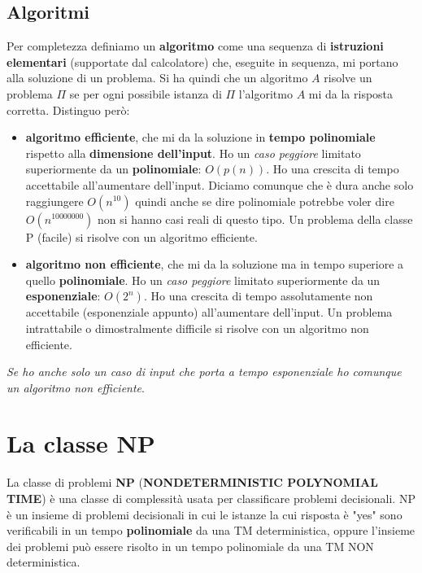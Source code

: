 \subsection{Algoritmi}
Per completezza definiamo un \textbf{algoritmo} come una sequenza di
\textbf{istruzioni elementari} (supportate dal calcolatore) che, eseguite in
sequenza, mi portano alla soluzione di un problema. Si ha quindi che un
algoritmo $A$ risolve un problema $\Pi$ se per ogni possibile istanza di $\Pi$
l'algoritmo $A$ mi da la risposta corretta. Distinguo però:
\begin{itemize}
	\item \textbf{algoritmo efficiente}, che mi da la soluzione in \textbf{tempo
	      polinomiale} rispetto alla \textbf{dimensione dell'input}. Ho un
	\textit{caso peggiore} limitato superiormente da un \textbf{polinomiale}:
	$O(p(n))$. Ho una crescita di tempo accettabile all'aumentare
	dell'input. Diciamo comunque che è dura anche solo raggiungere $O(n^{10})$
	quindi anche se dire polinomiale potrebbe voler dire $O(n^{10000000})$ non si
	hanno casi reali di questo tipo. Un problema della classe P (facile) si risolve con un algoritmo efficiente.
		  
	\item \textbf{algoritmo non efficiente}, che mi da la soluzione ma in tempo
	      superiore a quello \textbf{polinomiale}. Ho un \textit{caso peggiore} limitato
	      superiormente da un \textbf{esponenziale}: $O(2^n)$. Ho una crescita di tempo
	      assolutamente non accettabile (esponenziale appunto) all'aumentare dell'input. Un problema intrattabile o dimostralmente difficile si risolve con un algoritmo non efficiente.
\end{itemize}
\textit{Se ho anche solo un caso di input che porta a tempo esponenziale ho
	comunque un algoritmo non efficiente}.\\

\section{La classe NP}
La classe di problemi \textbf{NP} (\textbf{NONDETERMINISTIC POLYNOMIAL TIME}) è una classe di complessità usata per classificare problemi decisionali. NP è un insieme di problemi decisionali in cui le istanze la cui risposta è "yes" sono verificabili in un tempo \textbf{polinomiale} da una TM deterministica, oppure l'insieme dei problemi può essere risolto in un tempo polinomiale da una TM NON deterministica.


